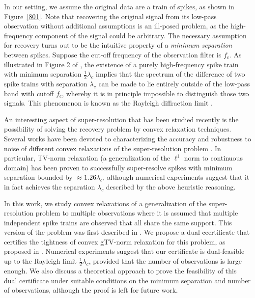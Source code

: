 \documentclass[11pt]{article}
\begin{document}
In our setting, we assume the original data are a train of spikes, as shown in Figure~\ref{801}. Note that recovering the original signal from its low-pass observation without additional assumptions is an ill-posed problem, as the high-frequency component of the signal could be arbitrary. The necessary assumption for recovery turns out to be the intuitive property of a \emph{minimum separation} between spikes. Suppose the cut-off frequency of the observation filter is $f_c$. As illustrated in Figure 2 of \cite{fernandez2016super}, the existence of a purely high-frequency spike train with minimum separation $ \frac{1}{2}\lambda_c $ implies that the spectrum of the difference of two spike trains with separation $ \lambda_c $ can be made to lie entirely outside of the low-pass band with cutoff $ f_c $, whereby it is in principle impossible to distinguish those two signals. This phenomenon is known as the Rayleigh diffraction limit \cite{fernandez2016super}.

An interesting aspect of super-resolution that has been studied recently is the possibility of solving the recovery problem by convex relaxation techniques. Several works have been devoted to characterizing the accuracy and robustness to noise of different convex relaxations of the super-resolution problem \cite{candes2014towards,azais2015spike,duval2015exact,fernandez2013support,tang2015near}. In particular, \textsf{TV}-norm relaxation (a generalization of the $ \ell^1 $ norm to continuous domain) has been proven to successfully super-resolve spikes with minimum separation bounded by $ \approx 1.26\lambda_c $, although numerical experiments suggest that it in fact achieves the separation $\lambda_c$ described by the above heuristic reasoning.

In this work, we study convex relaxations of a generalization of the super-resolution problem to multiple observations where it is assumed that multiple independent spike trains are observed that all share the same support. This version of the problem was first described in \cite{fernandez2016super}. We propose a dual ceertificate that certifies the tightness of convex \textsf{gTV}-norm relaxation for this problem, as proposed in \cite{fernandez2016super}. Numerical experiments suggest that our certificate is dual-feasible up to the Rayleigh limit $\frac{1}{2}\lambda_c$, provided that the number of observations is large enough. We also discuss a theoretical approach to prove the feasibility of this dual certificate under suitable conditions on the minimum separation and number of observations, although the proof is left for future work.
\end{document}

